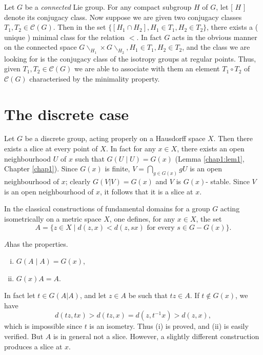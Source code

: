 \begin{rem}%
  Let $G$ be a {\em connected} Lie group. For any compact subgroup  $H
  $ of  $ G$, let [ $ H $ ] denote its conjugacy class. Now suppose we
  are  given two conjugacy classes  $ T_1, T_2  \in  \mathscr{C} ( G )
  $. Then in the set  $ \{ [ H_1 \cap H_2 ],  H_1  \in T_1, H_2  \in
  T_2  \} $, there exists  a ( unique )  minimal class for the relation
  $ <  $.  In fact $ G $ acts in the  obvious manner on the connected
  space $ G \backslash  _{H{_1}} \times  G \backslash _{H{_2}}, H_1 \in
  T_1, H_2 \in T_2 $,  and the class we are looking for is the
  conjugacy class of  the isotropy   groups at regular points. Thus,
  given $ T_1, T_2 \in \mathscr{C} ( G ) $  we are able to associate
  with them an element  $T_1 \circ T_2$  of  $ \mathscr{C} (G)$
  characterised by the minimality property. 
\end{rem}  


\section{The discrete  case} %

Let  $G$ be  a discrete  group, acting properly on  a Hausdorff space
$X$. Then there exists a slice at every point of $X$. In fact for any
$ x \in X $, there  exists an open neighbourhood   $U$ of  $x$  such
that  $G( U \mid U) = G (x)$ (Lemma \ref{chap1:lem1}, Chapter \ref{chap1}).  Since $
G(x)$ is finite, $V = \bigcap\limits_{g \in G(x)} g U$ is an open
neighbourhood of $x$; clearly $G(V|V) = G(x)$ and $V$ is  
$G(x)$- stable. Since  $V$ is an open neighbourhood of $x$, it follows
that it is a  slice at  $x$. 

\begin{remark*}
  In the classical constructions  of  fundamental  domains for a group
  $G$ acting isometrically on a  metric space $ X$, one defines, for any
  $x \in X$, the set 
  $$
  A  = \{ z \in X \mid d ( z, x ) <  d ( z, sx )  \text{  for every }
  s \in G - G (x) \}. 
  $$
\end{remark*}
$A$\pageoriginale has the properties.

\begin{enumerate}[(i)]
 \item $G(A \mid A )  = G ( x ) $,
 \item $G(x) A= A $. 
\end{enumerate}

In fact let $t \in G(A|A)$, and  let $ z \in A $  be such that  $
tz \in A $. If  $t \not\in  G (x) $, we have  
$$
 d ( tz, tx )  >  d ( tz, x ) = d ( z, t^{-1} x )  >  d ( z, x ),
$$
which is impossible since $t$  is an isometry. Thus (i) is
proved, and (ii) is  easily verified. But $A$ is in general
not a slice. However, a slightly different construction  produces a
slice at $x$.  
   
